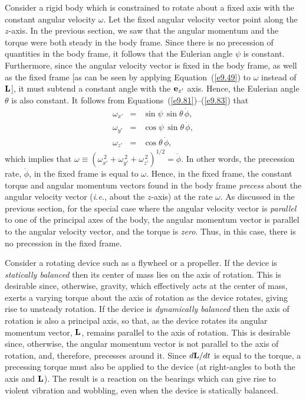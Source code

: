 Consider a rigid body which is constrained to rotate about a fixed axis with
the constant angular velocity $\omega$. Let the fixed angular velocity
vector point along the $z$-axis.  In the previous section, we saw that
the angular momentum and the torque were both steady in the body frame.
Since there is no precession of quantities in the body frame, it follows that
the Eulerian angle $\psi$ is  constant. Furthermore, since the angular velocity vector is
fixed in the body frame, as well as the fixed frame [as can be seen by applying Equation~(\ref{e9.49})
to \mbox{\boldmath$\omega$} instead of ${\bf L}$], it must subtend a constant angle  with the
${\bf e}_{z'}$ axis. Hence, the Eulerian angle $\theta$ is also constant.
It follows from Equations~(\ref{e9.81})--(\ref{e9.83}) that
\begin{eqnarray}
\omega_{x'} &=& \sin\psi\,\sin\theta\,\dot{\phi},\\[0.5ex]
\omega_{y'} &=& \cos\psi\,\sin\theta\,\dot{\phi},\\[0.5ex]
\omega_{z'} &=& \cos\theta\,\dot{\phi},
\end{eqnarray}
which implies that $ \omega\equiv (\omega_{x'}^{\,2}+\omega_{y'}^{\,2}+\omega_{z'}^{\,2})^{1/2}=\dot{\phi}$. In other words, the precession
rate, $\dot{\phi}$,  in the fixed frame is equal to $\omega$. Hence, in the fixed frame,
the constant torque and angular momentum vectors found in the body
frame {\em precess}\/ about the angular velocity vector ({\em i.e.}, about the
$z$-axis) at the rate $\omega$. As discussed in the previous section, for the special case where the angular
velocity vector is {\em parallel}\/ to one of the  principal axes of the body, the angular
momentum vector is parallel to the angular velocity vector, and the torque is {\em zero}. Thus,
in this case, there is no precession in the fixed frame.

Consider a rotating device such as a flywheel or a propeller. If the device
is {\em statically balanced}\/ then its center of mass lies on the axis
of rotation. This is desirable since, otherwise, gravity, which effectively
acts at the center of mass, exerts a varying torque about the
axis of rotation as the device rotates, giving rise to unsteady rotation. If the device is
{\em dynamically balanced}\/ then the axis of rotation is also
a principal axis, so that, as the device rotates its angular momentum vector,
${\bf L}$,
remains parallel to the axis of rotation. This is desirable since, otherwise,
the angular momentum vector is not parallel to the axis of rotation, and, therefore, precesses around it. Since $d{\bf L}/dt$ is equal to the
torque, a precessing torque must also be applied to the device (at right-angles
to both the axis and ${\bf L}$). The result is a reaction
on the bearings which can give rise to violent vibration and
wobbling, even when the device is statically balanced.


